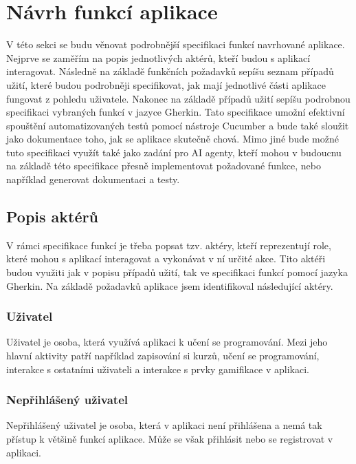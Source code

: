﻿%
\section{Návrh funkcí aplikace}

V této sekci se budu věnovat podrobnější specifikaci funkcí navrhované aplikace. Nejprve se zaměřím na popis jednotlivých aktérů, kteří budou s aplikací interagovat. Následně na základě funkčních požadavků sepíšu seznam případů užití, které budou podrobněji specifikovat, jak mají jednotlivé části aplikace fungovat z pohledu uživatele. Nakonec na základě případů užití sepíšu podrobnou specifikaci vybraných funkcí v jazyce Gherkin. Tato specifikace umožní efektivní spouštění automatizovaných testů pomocí nástroje Cucumber a bude také sloužit jako dokumentace toho, jak se aplikace skutečně chová. Mimo jiné bude možné tuto specifikaci využít také jako zadání pro AI agenty, kteří mohou v budoucnu na základě této specifikace přesně implementovat požadované funkce, nebo například generovat dokumentaci a testy.

\subsection{Popis aktérů}

V rámci specifikace funkcí je třeba popsat tzv. aktéry, kteří reprezentují role, které mohou s aplikací interagovat a vykonávat v ní určité akce. Tito aktéři budou využiti jak v popisu případů užití, tak ve specifikaci funkcí pomocí jazyka Gherkin. Na základě požadavků aplikace jsem identifikoval následující aktéry.

\subsubsection{Uživatel}

Uživatel je osoba, která využívá aplikaci k učení se programování. Mezi jeho hlavní aktivity patří například zapisování si kurzů, učení se programování, interakce s ostatními uživateli a interakce s prvky gamifikace v aplikaci.

\subsubsection{Nepřihlášený uživatel}

Nepřihlášený uživatel je osoba, která v aplikaci není přihlášena a nemá tak přístup k většině funkcí aplikace. Může se však přihlásit nebo se registrovat v aplikaci.

